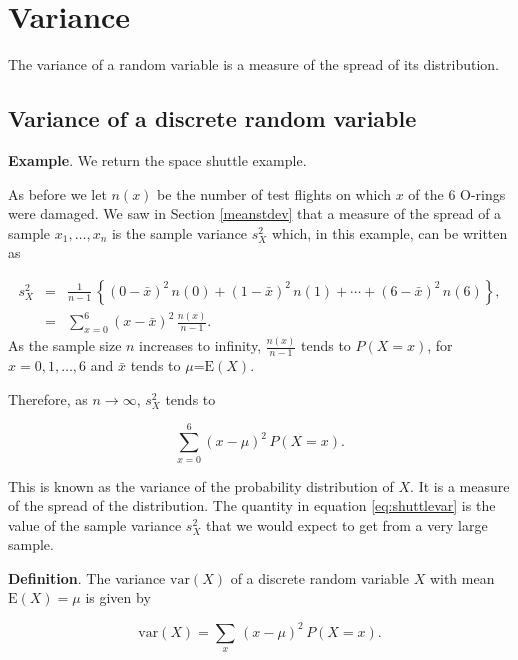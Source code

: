 \documentclass[
  british,
]{book}
\begin{document}
\hypertarget{variance}{%
\section{Variance}\label{variance}}

The variance of a random variable is a measure of the spread of its distribution.

\hypertarget{variance-of-a-discrete-random-variable}{%
\subsection{Variance of a discrete random variable}\label{variance-of-a-discrete-random-variable}}

\textbf{Example}. We return the space shuttle example.

As before we let \(n(x)\) be the number of test flights on which \(x\) of the 6 O-rings were damaged. We saw in Section \ref{meanstdev} that a measure of the spread of a sample \(x_1,\ldots,x_n\) is the sample variance \(s_X^2\) which, in this example, can be written as

\begin{eqnarray*}
s_X^2 &=& \frac{1}{n-1}\,\left\{
(0-\bar{x})^2\,n(0)+(1-\bar{x})^2\,n(1)+\cdots+(6-\bar{x})^2\,n(6) \right\},
\\
      &=& \sum_{x=0}^6 (x-\bar{x})^2\,\frac{n(x)}{n-1}. 
\end{eqnarray*}
As the sample size \(n\) increases to infinity, \(\frac{n(x)}{n-1}\) tends to \(P(X=x)\), for \(x=0,1,\ldots,6\) and \(\bar{x}\) tends to \(\mu\)=\(\mathrm{E}(X)\).

Therefore, as \(n \rightarrow \infty\), \(s_X^2\) tends to

\begin{equation}
\sum_{x=0}^6 (x-\mu)^2\,P(X=x). 
\label{eq:shuttlevar}
\end{equation}

This is known as the variance of the probability distribution of \(X\). It is a measure of the spread of the distribution. The quantity in equation \eqref{eq:shuttlevar} is the value of the sample variance \(s_X^2\) that we would expect to get from a very large sample.

\textbf{Definition}. The variance \(\mathrm{var}(X)\) of a discrete random variable \(X\) with mean \(\mathrm{E}(X)=\mu\) is given by

\begin{equation}
\mathrm{var}(X) = \sum_x\,(x-\mu)^2\,P(X=x). 
\label{eq:varidisc}
\end{equation}
\end{document}
